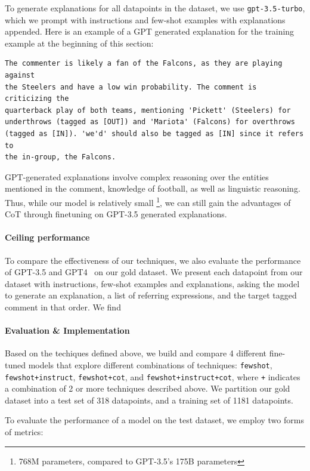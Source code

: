 To generate explanations for all datapoints in the dataset, we use \texttt{gpt-3.5-turbo}, which we prompt with instructions and few-shot examples with explanations appended. Here is an example of a GPT generated explanation for the training example at the beginning of this section:

\begin{verbatim}
The commenter is likely a fan of the Falcons, as they are playing against 
the Steelers and have a low win probability. The comment is criticizing the 
quarterback play of both teams, mentioning 'Pickett' (Steelers) for 
underthrows (tagged as [OUT]) and 'Mariota' (Falcons) for overthrows 
(tagged as [IN]). 'we'd' should also be tagged as [IN] since it refers to 
the in-group, the Falcons.
\end{verbatim}

GPT-generated explanations involve complex reasoning over the entities mentioned in the comment, knowledge of football, as well as linguistic reasoning. Thus, while our model is relatively small \footnote{768M parameters, compared to GPT-3.5's 175B parameters}, we can still gain the advantages of CoT through finetuning on GPT-3.5 generated explanations.

\paragraph{Ceiling performance} To compare the effectiveness of our techniques, we also evaluate the performance of GPT-3.5 and GPT4~\citep{achiam2023gpt} on our gold dataset. We present each datapoint from our dataset with instructions, few-shot examples and explanations, asking the model to generate an explanation, a list of referring expressions, and the target tagged comment in that order. We find 

\paragraph{Evaluation \& Implementation} Based on the techiques defined above, we build and compare 4 different fine-tuned models that explore different combinations of techniques: \texttt{fewshot}, \texttt{fewshot+instruct}, \texttt{fewshot+cot}, and \texttt{fewshot+instruct+cot}, where \texttt{+} indicates a combination of 2 or more techniques described above. We partition our gold dataset into a test set of 318 datapoints, and a training set of 1181 datapoints. 

To evaluate the performance of a model on the test dataset, we employ two forms of metrics:

